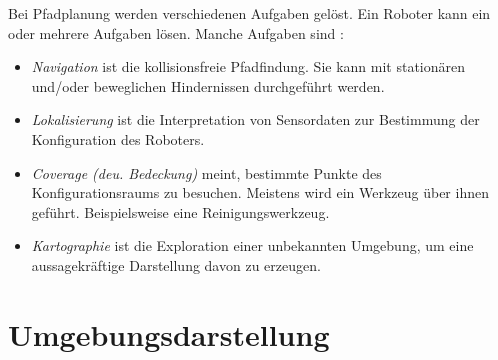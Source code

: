 Bei Pfadplanung werden verschiedenen Aufgaben gelöst. Ein Roboter kann ein oder mehrere Aufgaben lösen. Manche Aufgaben sind \cite[~S. 9,10]{Principles:05}:
\begin{itemize}
	\item \textit{Navigation} ist die kollisionsfreie Pfadfindung. Sie kann mit stationären und/oder beweglichen Hindernissen durchgeführt werden.
	\item \textit{Lokalisierung} ist die Interpretation von Sensordaten zur Bestimmung der Konfiguration des Roboters.
	\item \textit{Coverage (deu. Bedeckung)} meint, bestimmte Punkte des Konfigurationsraums zu besuchen. Meistens wird ein Werkzeug über ihnen geführt. Beispielsweise eine Reinigungswerkzeug.
	\item \textit{Kartographie} ist die Exploration einer unbekannten Umgebung, um eine aussagekräftige Darstellung davon zu erzeugen.
\end{itemize}

\section{Umgebungsdarstellung}

